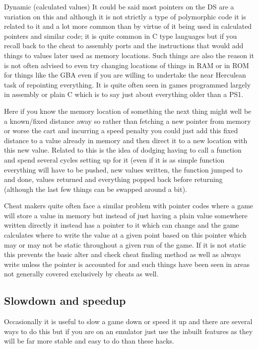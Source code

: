 \documentclass[
]{book}
\begin{document}
Dynamic (calculated values) It could be said most pointers on the DS are a variation on this and although it is not strictly a type of polymorphic code it is related to it and a lot more common than by virtue of it being used in calculated pointers and similar code; it is quite common in C type languages but if you recall back to the cheat to assembly ports and the instructions that would add things to values later used as memory locations. Such things are also the reason it is not often advised to even try changing locations of things in RAM or in ROM for things like the GBA even if you are willing to undertake the near Herculean task of repointing everything. It is quite often seen in games programmed largely in assembly or plain C which is to say just about everything older than a PS1.

Here if you know the memory location of something the next thing might well be a known/fixed distance away so rather than fetching a new pointer from memory or worse the cart and incurring a speed penalty you could just add this fixed distance to a value already in memory and then direct it to a new location with this new value. Related to this is the idea of dodging having to call a function and spend several cycles setting up for it (even if it is as simple function everything will have to be pushed, new values written, the function jumped to and done, values returned and everything popped back before returning (although the last few things can be swapped around a bit).

Cheat makers quite often face a similar problem with pointer codes where a game will store a value in memory but instead of just having a plain value somewhere written directly it instead has a pointer to it which can change and the game calculates where to write the value at a given point based on this pointer which may or may not be static throughout a given run of the game. If it is not static this prevents the basic alter and check cheat finding method as well as always write unless the pointer is accounted for and such things have been seen in areas not generally covered exclusively by cheats as well.

\hypertarget{slowdown-and-speedup}{%
\subsection{Slowdown and speedup}\label{slowdown-and-speedup}}

Occasionally it is useful to slow a game down or speed it up and there are several ways to do this but if you are on an emulator just use the inbuilt features as they will be far more stable and easy to do than these hacks.
\end{document}
